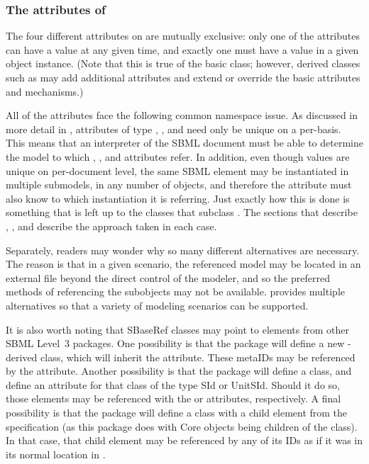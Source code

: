 \subsubsection{The attributes of }

The four different attributes on \SBaseRef are mutually exclusive: only
one of the attributes can have a value at any given time, and exactly
one must have a value in a given \SBaseRef object instance.  (Note that
this is true of the basic \SBaseRef class; however, derived classes such
as \ReplacedElement may add additional attributes and extend or override
the basic attributes and mechanisms.)

All of the attributes face the following common namespace issue.  As
discussed in more detail in , attributes of type
, , and  need only be
unique on a per-\Model basis.  This means that an interpreter of the
SBML document must be able to determine the model to which
, , and  attributes refer.
In addition, even though  values are unique on per-document
level, the same SBML element may be instantiated in multiple submodels,
in any number of \Model objects, and therefore the 
attribute must also know to which \Model instantiation it is referring.
Just exactly how this is done is something that is left up to the
classes that subclass \SBaseRef.  The sections that describe \Port,
\Deletion, \ReplacedElement and \ReplacedBy describe the approach taken
in each case.

Separately, readers may wonder why so many different alternatives are
necessary.  The reason is that in a given scenario, the referenced model
may be located in an external file beyond the direct control of the
modeler, and so the preferred methods of referencing the subobjects may
not be available.  \SBaseRef provides multiple alternatives so that a
variety of modeling scenarios can be supported.

It is also worth noting that SBaseRef classes may point to elements
from other SBML Level~3 packages.  One possibility is that the package
will define a new \SBase-derived class, which will inherit the 
attribute.  These metaIDs may be referenced by the \SBaseRef {}
attribute.  Another possibility is that the package will define a class,
and define an attribute for that class of the type SId or UnitSId.  Should
it do so, those elements may be referenced with the  or 
attributes, respectively.  A final possibility is that the package will 
define a class with a child element from the \sbmlthreecore specification (as this 
package does with Core \Model objects being children of the 
\ListOfModelDefinitions class).  In that case, that child element may be 
referenced by any of its IDs as if it was in its normal location in \sbmlthreecore.

